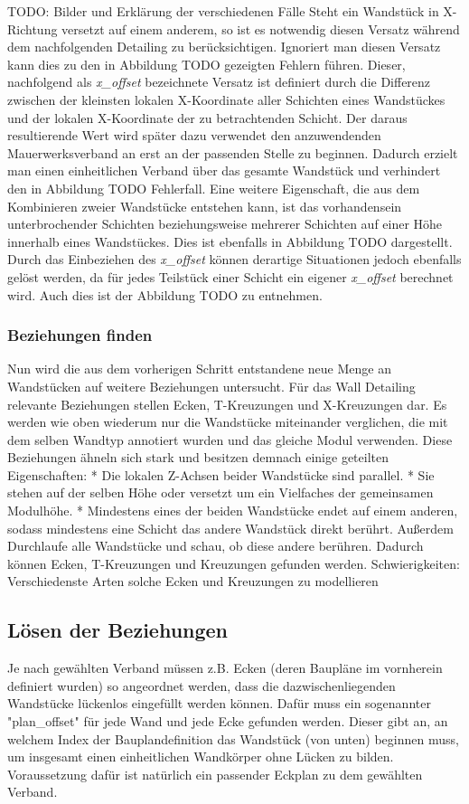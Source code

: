 TODO: Bilder und Erklärung der verschiedenen Fälle
Steht ein Wandstück in X-Richtung versetzt auf einem anderem, so ist es notwendig diesen Versatz während dem nachfolgenden Detailing zu berücksichtigen.
Ignoriert man diesen Versatz kann dies zu den in Abbildung TODO gezeigten Fehlern führen.
Dieser, nachfolgend als \textit{x\_offset} bezeichnete Versatz ist definiert durch die Differenz zwischen der kleinsten lokalen X-Koordinate aller Schichten eines Wandstückes und der lokalen X-Koordinate der zu betrachtenden Schicht.
Der daraus resultierende Wert wird später dazu verwendet den anzuwendenden Mauerwerksverband an erst an der passenden Stelle zu beginnen.
Dadurch erzielt man einen einheitlichen Verband über das gesamte Wandstück und verhindert den in Abbildung TODO Fehlerfall.
Eine weitere Eigenschaft, die aus dem Kombinieren zweier Wandstücke entstehen kann, ist das vorhandensein unterbrochender Schichten beziehungsweise mehrerer Schichten auf einer Höhe innerhalb eines Wandstückes.
Dies ist ebenfalls in Abbildung TODO dargestellt.
Durch das Einbeziehen des \textit{x\_offset} können derartige Situationen jedoch ebenfalls gelöst werden, da für jedes Teilstück einer Schicht ein eigener \textit{x\_offset} berechnet wird.
Auch dies ist der Abbildung TODO zu entnehmen.

\subsubsection{Beziehungen finden}
Nun wird die aus dem vorherigen Schritt entstandene neue Menge an Wandstücken auf weitere Beziehungen untersucht.
Für das Wall Detailing relevante Beziehungen stellen Ecken, T-Kreuzungen und X-Kreuzungen dar.
Es werden wie oben wiederum nur die Wandstücke miteinander verglichen, die mit dem selben Wandtyp annotiert wurden und das gleiche Modul verwenden.
Diese Beziehungen ähneln sich stark und besitzen demnach einige geteilten Eigenschaften:
* Die lokalen Z-Achsen beider Wandstücke sind parallel.
* Sie stehen auf der selben Höhe oder versetzt um ein Vielfaches der gemeinsamen Modulhöhe.
* Mindestens eines der beiden Wandstücke endet auf einem anderen, sodass mindestens eine Schicht das andere Wandstück direkt berührt.
Außerdem 
Durchlaufe alle Wandstücke und schau, ob diese andere berühren.
Dadurch können Ecken, T-Kreuzungen und Kreuzungen gefunden werden.
Schwierigkeiten: Verschiedenste Arten solche Ecken und Kreuzungen zu modellieren 

\subsection{Lösen der Beziehungen}
Je nach gewählten Verband müssen z.B. Ecken (deren Baupläne im vornherein definiert wurden) so angeordnet werden, dass die dazwischenliegenden Wandstücke lückenlos eingefüllt werden können.
Dafür muss ein sogenannter "plan\_offset" für jede Wand und jede Ecke gefunden werden. Dieser gibt an, an welchem Index der Bauplandefinition das Wandstück (von unten) beginnen muss, um insgesamt einen einheitlichen Wandkörper ohne Lücken zu bilden.
Voraussetzung dafür ist natürlich ein passender Eckplan zu dem gewählten Verband. 

